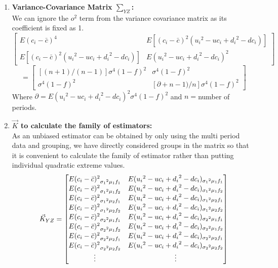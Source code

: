 \documentclass[12pt]{article}   	%
\begin{document}
\begin{enumerate}
\item \textbf{Variance-Covariance Matrix $\sum_{YZ} $:}\\
We can ignore the $o^2$ term from the variance covariance matrix as its coefficient is fixed as 1.
 $$  \begin{bmatrix}
			E(c_i-\bar{c})^4 & E[(c_i-\bar{c})^2({u_i}^2-uc_i+{d_i}^2-dc_i)]\\
			E[(c_i-\bar{c})^2({u_i}^2-uc_i+{d_i}^2-dc_i)]&E({u_i}^2-uc_i+{d_i}^2-dc_i)^2
			\end{bmatrix}$$
$$=\begin{bmatrix}
[(n+1)/(n-1)]\sigma^4(1-f)^2&\sigma^4(1-f)^2\\
\sigma^4(1-f)^2&[\partial +n-1)/n]\sigma^4(1-f)^2
\end{bmatrix}$$
Where $\partial	= E({u_i}^2-uc_i+{d_i}^2-dc_i)^2 \sigma^4(1-f)^2$ and $n=$number of periods.
\item \textbf{$\vec{K}$ to calculate the family of estimators:}\\
As an unbiased estimator can be obtained by only using the multi period data and grouping, we have directly considered groups in the matrix so that it is convenient to calculate the family of estimator rather than putting individual quadratic extreme values.
\begin{multline}
$$\vec{K}_{YZ}=
\begin{bmatrix}
E{(c_i-\bar{c})^2}_{{\sigma_1}^2 \mu_1 f_1}&E({{u_i}^2-uc_i+{d_i}^2-dc_i})_{{\sigma_1}^2 \mu_1 f_1}\\
E{(c_i-\bar{c})^2}_{{\sigma_1}^2 \mu_1 f_2}&E({{u_i}^2-uc_i+{d_i}^2-dc_i})_{{\sigma_1}^2 \mu_1 f_2}\\
E{(c_i-\bar{c})^2}_{{\sigma_1}^2 \mu_2 f_1}&E({{u_i}^2-uc_i+{d_i}^2-dc_i})_{{\sigma_1}^2 \mu_2 f_1}\\
E{(c_i-\bar{c})^2}_{{\sigma_1}^2 \mu_2 f_2}&E({{u_i}^2-uc_i+{d_i}^2-dc_i})_{{\sigma_1}^2 \mu_2 f_2}\\
E{(c_i-\bar{c})^2}_{{\sigma_2}^2 \mu_1 f_1}&E({{u_i}^2-uc_i+{d_i}^2-dc_i})_{{\sigma_2}^2 \mu_1 f_1}\\
E{(c_i-\bar{c})^2}_{{\sigma_2}^2 \mu_1 f_2}&E({{u_i}^2-uc_i+{d_i}^2-dc_i})_{{\sigma_2}^2 \mu_1 f_2}\\
E{(c_i-\bar{c})^2}_{{\sigma_2}^2 \mu_2 f_1}&E({{u_i}^2-uc_i+{d_i}^2-dc_i})_{{\sigma_2}^2 \mu_2 f_1}\\
E{(c_i-\bar{c})^2}_{{\sigma_2}^2 \mu_2 f_2}&E({{u_i}^2-uc_i+{d_i}^2-dc_i})_{{\sigma_2}^2 \mu_2 f_2}\\
\vdots&\vdots\\

\end{bmatrix}$$
\end{multline}
\end{enumerate}
\end{document}
